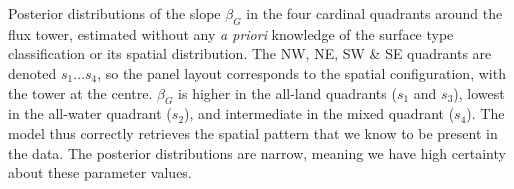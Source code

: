 \label{fig:Beta_SWI_byS04_Stor} Posterior distributions of the
slope \(\beta_{G}\) in the four cardinal quadrants around the flux
tower, estimated without any \emph{a priori} knowledge of the surface
type classification or its spatial distribution. The NW, NE, SW \& SE
quadrants are denoted \(s_{1} \dots s_{4}\), so the panel layout
corresponds to the spatial configuration, with the tower at the centre.
\(\beta_{G}\) is higher in the all-land quadrants (\(s_{1}\) and
\(s_{3}\)), lowest in the all-water quadrant (\(s_{2}\)), and
intermediate in the mixed quadrant (\(s_{4}\)). The model thus correctly
retrieves the spatial pattern that we know to be present in the data.
The posterior distributions are narrow, meaning we have high certainty
about these parameter values.